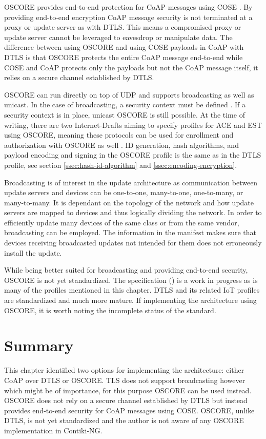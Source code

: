 \documentclass[0-thesis.tex]{subfiles}
\begin{document}
OSCORE provides end-to-end protection for CoAP messages using COSE \parencite{oscore}. By
providing end-to-end encryption CoAP message security is not terminated at a proxy or
update server as with DTLS. This means a compromised proxy or update server cannot be
leveraged to eavesdrop or manipulate data. The difference between using OSCORE and using
COSE payloads in CoAP with DTLS is that OSCORE protects the entire CoAP message end-to-end
while COSE and CoAP protects only the payloads but not the CoAP message itself, it relies
on a secure channel established by DTLS.

OSCORE can run directly on top of UDP and supports broadcasting as well as unicast. In the
case of broadcasting, a security context must be defined \parencite{oscore-group}. If a
security context is in place, unicast OSCORE is still possible. At the time of writing,
there are two Internet-Drafts aiming to specify profiles for ACE and EST using OSCORE,
meaning these protocols can be used for enrollment and authorization with OSCORE as well
\parencite{ace-oscore, est-oscore}. ID generation, hash algorithms, and payload encoding
and signing in the OSCORE profile is the same as in the DTLS profile, see section
\ref{ssec:hash-id-algorithm} and \ref{ssec:encoding-encryption}.


Broadcasting is of interest in the update architecture as communication between update
servers and devices can be one-to-one, many-to-one, one-to-many, or many-to-many. It is
dependant on the topology of the network and how update servers are mapped to devices and
thus logically dividing the network. In order to efficiently update many devices of the
same class or from the same vendor, broadcasting can be employed. The information in the
manifest makes sure that devices receiving broadcasted updates not intended for them does
not erroneously install the update.

While being better suited for broadcasting and providing end-to-end security, OSCORE is
not yet standardized. The specification (\parencite{oscore}) is a work in progress as is
many of the profiles mentioned in this chapter. DTLS and its related IoT profiles are
standardized and much more mature. If implementing the architecture using OSCORE, it is
worth noting the incomplete status of the standard.

\section{Summary}
\label{sec:5-summary}
This chapter identified two options for implementing the architecture: either CoAP over
DTLS or OSCORE. TLS does not support broadcasting however which might be of importance,
for this purpose OSCORE can be used instead. OSCORE does not rely on a secure channel
established by DTLS but instead provides end-to-end security for CoAP messages using COSE.
OSCORE, unlike DTLS, is not yet standardized and the author is not aware of any OSCORE
implementation in Contiki-NG. 
\end{document}
